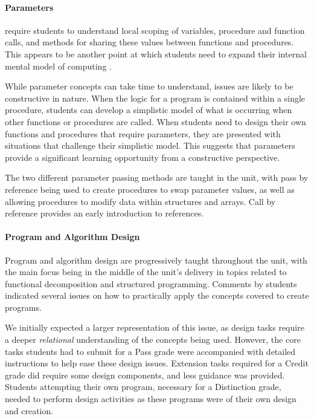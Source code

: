 \paragraph{Parameters} %
\label{ssub:parameters}

require students to understand local scoping of variables, procedure and function calls, and methods for sharing these values between functions and procedures. This appears to be another point at which students need to expand their internal mental model of computing \cite{Hoc:1990}. 

While parameter concepts can take time to understand, issues are likely to be constructive in nature. When the logic for a program is contained within a single procedure, students can develop a simplistic model of what is occurring when other functions or procedures are called. When students need to design their own functions and procedures that require parameters, they are presented with situations that challenge their simplistic model. This suggests that parameters provide a significant learning opportunity from a constructive perspective.

The two different parameter passing methods are taught in the unit, with pass by reference being used to create procedures to swap parameter values, as well as allowing procedures to modify data within structures and arrays. Call by reference provides an early introduction to references. 




\paragraph{Program and Algorithm Design} %
\label{ssub:program_and_algorithm_design}

Program and algorithm design are progressively taught throughout the unit, with the main focus being in the middle of the unit's delivery in topics related to functional decomposition and structured programming. Comments by students indicated several issues on how to practically apply the concepts covered to create programs. 

We initially expected a larger representation of this issue, as design tasks require a deeper \emph{relational} understanding of the concepts being used. However, the core tasks students had to submit for a Pass grade were accompanied with detailed instructions to help ease these design issues. Extension tasks required for a Credit grade did require some design components, and less guidance was provided. Students attempting their own program, necessary for a Distinction grade, needed to perform design activities as these programs were of their own design and creation.

